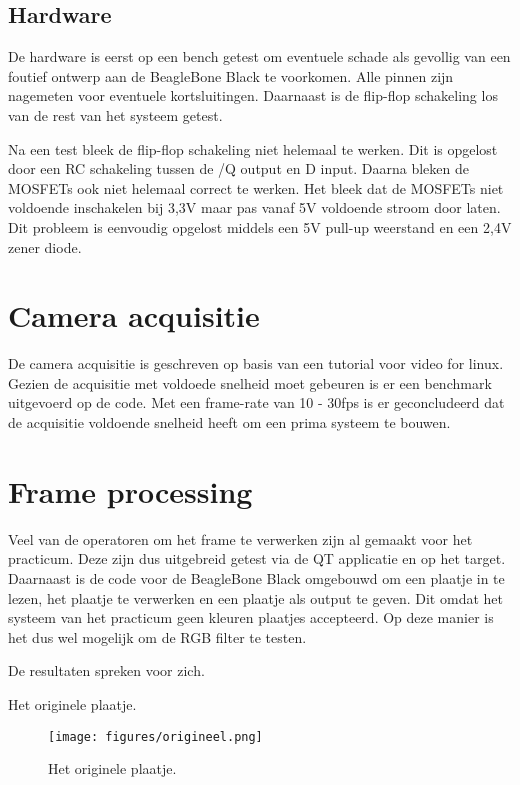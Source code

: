 \subsection{Hardware}
\label{sub:gpioHard}
De hardware is eerst op een bench getest om eventuele schade als gevollig van 
een foutief ontwerp aan de BeagleBone Black te voorkomen. Alle pinnen zijn 
nagemeten voor eventuele kortsluitingen. Daarnaast is de flip-flop schakeling 
los van de rest van het systeem getest.

Na een test bleek de flip-flop schakeling niet helemaal te werken. Dit is opgelost 
door een RC schakeling tussen de /Q output en D input. Daarna bleken de MOSFETs 
ook niet helemaal correct te werken. Het bleek dat de MOSFETs niet voldoende 
inschakelen bij 3,3V maar pas vanaf 5V voldoende stroom door laten. Dit probleem 
is eenvoudig opgelost middels een 5V pull-up weerstand en een 2,4V zener diode.

\section{Camera acquisitie}
\label{sec:camAcq}
De camera acquisitie is geschreven op basis van een tutorial voor video for 
linux. Gezien de acquisitie met voldoede snelheid moet gebeuren is er een 
benchmark uitgevoerd op de code. Met een frame-rate van 10 - 30fps is er 
geconcludeerd dat de acquisitie voldoende snelheid heeft om een prima 
systeem te bouwen.

\section{Frame processing}
\label{sec:framePross}
Veel van de operatoren om het frame te verwerken zijn al gemaakt voor het 
practicum. Deze zijn dus uitgebreid getest via de QT applicatie en op het 
target. Daarnaast is de code voor de BeagleBone Black omgebouwd om een 
plaatje in te lezen, het plaatje te verwerken en een plaatje als output 
te geven. Dit omdat het systeem van het practicum geen kleuren plaatjes 
accepteerd. Op deze manier is het dus wel mogelijk om de RGB filter te 
testen.

De resultaten spreken voor zich.

Het originele plaatje.
\begin{figure}
    \begin{center}
        \texttt{[image: figures/origineel.png]}
    \end{center}
    \caption{Het originele plaatje.}
    \label{fig:org}
\end{figure}

